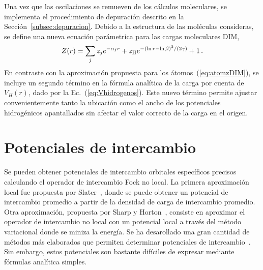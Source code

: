 Una vez que las oscilaciones se remueven de los cálculos moleculares, 
se implementa el procedimiento de depuración descrito en la 
Sección~\ref{subsec:depuracion}. Debido a la estructura de las moléculas 
consideras, se define una nueva ecuación parámetrica para las cargas 
moleculares DIM,
\begin{eqnarray}
 Z(r) = \sum_j z_j e^{-\alpha_j r} 
 + z_{\mbox{\scriptsize H}} e^{-(\ln r - \ln \beta)^2/(2\gamma)} 
 + 1\,.
 \label{eq:molzDIM}
\end{eqnarray}
En contraste con la aproximación propuesta para los 
átomos~(\ref{eq:atomzDIM}), se incluye un segundo término en la fórmula 
analítica de la carga por cuenta de $V_H(r)$, dado 
por la Ec.~(\ref{eq:Vhidrogenos}). Este nuevo término permite ajustar 
convenientemente tanto la ubicación como el ancho de los potenciales 
hidrogénicos apantallados sin afectar el valor correcto de la carga en 
el origen.

\section{Potenciales de intercambio}
\label{sec:exchpot}

Se pueden obtener potenciales de intercambio orbitales específicos 
precisos calculando el operador de intercambio Fock no local. La primera 
aproximación local fue propuesta por Slater~\cite{Slater:51}, donde se 
puede obtener un potencial de intercambio promedio a partir de la 
densidad de carga de intercambio promedio. Otra aproximación, propuesta
por Sharp y Horton~\cite{Sharp:53}, consiste en aproximar el operador de
intercambio no local con un potencial local a través del método 
variacional donde se miniza la energía. Se ha desarollado una gran 
cantidad de métodos más elaborados que permiten determinar potenciales 
de intercambio~\cite{Krieger:92,Gorling:92,Yang:02,Staroverov:06,
Ryabinkin:13}. Sin embargo, estos potenciales son bastante difíciles de 
expresar mediante fórmulas analítica simples.

